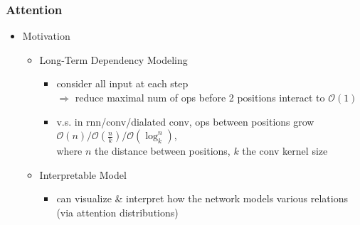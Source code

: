 \subsubsection{Attention}
\begin{itemize}
\item Motivation
	\begin{itemize}
	\item Long-Term Dependency Modeling
		\begin{itemize}
		\item consider all input at each step \\
		$\Rightarrow$ reduce maximal num of ops before 2 positions interact to $\mathcal O(1)$
		\item v.s. in rnn/conv/dialated conv, ops between positions grow $\mathcal O(n) / \mathcal O(\frac nk) / \mathcal O(\log_k^n)$, \\
		where $n$ the distance between positions, $k$ the conv kernel size
		\end{itemize}
	\item Interpretable Model
		\begin{itemize}
		\item can visualize \& interpret how the network models various relations \\
		(via attention distributions)
		\end{itemize}
	\end{itemize}
	

\end{itemize}
